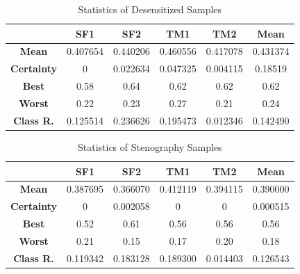 \documentclass[journal]{IEEEtran} %
\begin{document}
\begin{table}[!t]
    \centering
    \caption{Statistics of Desensitized Samples}
    \begin{tabular}{|c|c|c|c|c|c|}
        \hline
        & \textbf{SF1} & \textbf{SF2} & \textbf{TM1} & \textbf{TM2} & \textbf{Mean} \\
        \hline
        \textbf{Mean} & 0.407654 & 0.440206 & 0.460556 & 0.417078 & 0.431374 \\
        \hline
        \textbf{Certainty} & 0 & 0.022634 & 0.047325 & 0.004115 & 0.18519 \\
        \hline
        \textbf{Best} & 0.58 & 0.64 & 0.62 & 0.62 & 0.62 \\
        \hline
        \textbf{Worst} & 0.22 & 0.23 & 0.27 & 0.21 & 0.24 \\
        \hline
        \textbf{Class R.} & 0.125514 & 0.236626 & 0.195473 & 0.012346 & 0.142490 \\
        \hline
    \end{tabular}
    \label{tab:st_des}
\end{table}

\begin{table}[!t]
    \centering
    \caption{Statistics of Stenography Samples}
    \begin{tabular}{|c|c|c|c|c|c|}
        \hline
        & \textbf{SF1} & \textbf{SF2} & \textbf{TM1} & \textbf{TM2} & \textbf{Mean} \\
        \hline
        \textbf{Mean} & 0.387695 & 0.366070 & 0.412119 & 0.394115 & 0.390000 \\
        \hline
        \textbf{Certainty} & 0 & 0.002058 & 0 & 0 & 0.000515 \\
        \hline
        \textbf{Best} & 0.52 & 0.61 & 0.56 & 0.56 & 0.56 \\
        \hline
        \textbf{Worst} & 0.21 & 0.15 & 0.17 & 0.20 & 0.18 \\
        \hline
        \textbf{Class R.} & 0.119342 & 0.183128 & 0.189300 & 0.014403 & 0.126543 \\
        \hline
    \end{tabular}
    \label{tab:st_msg}
\end{table}
\end{document}
